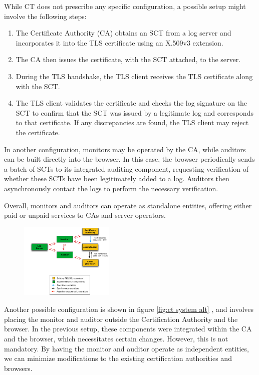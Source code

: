 While CT does not prescribe any specific configuration, a possible
setup might involve the following steps:
\begin{enumerate}
  \item The Certificate Authority (CA) obtains an SCT from a log
    server and incorporates it into the TLS certificate using an
    X.509v3 extension.
  \item The CA then issues the certificate, with the SCT attached, to
    the server.
  \item During the TLS handshake, the TLS client receives the TLS
    certificate along with the SCT.
  \item The TLS client validates the certificate and checks the log
    signature on the SCT to confirm that the SCT was issued by a
    legitimate log and corresponds to that certificate. If any
    discrepancies are found, the TLS client may reject the
    certificate.
\end{enumerate}

In another configuration, monitors may be operated by the CA, while
auditors can be built directly into the browser. In this case, the
browser periodically sends a batch of SCTs to its integrated auditing
component, requesting verification of whether these SCTs have been
legitimately added to a log. Auditors then asynchronously contact the
logs to perform the necessary verification.

Overall, monitors and auditors can operate as standalone entities,
offering either paid or unpaid services to CAs and server operators.

\begin{figure}
  \centering
  \includegraphics[width=0.4\textwidth]{img/x509 ct system alt.png}
  \label{fig:ct system alt}

\end{figure}

Another possible configuration is shown in figure \ref{fig:ct system
alt} , and involves placing the monitor and auditor outside the
Certification Authority  and the browser. In the previous setup, these
components were integrated within the CA and the browser, which
necessitates certain changes. However, this is not mandatory. By
having the monitor and auditor operate as independent entities, we can
minimize modifications to the existing certification authorities and
browsers.


